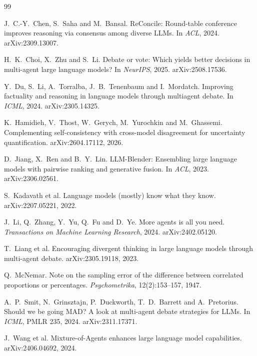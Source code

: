 \documentclass[11pt]{article}
\begin{document}
\begin{thebibliography}{99}
\setlength{\itemsep}{2pt}

 J.\ C.-Y.\ Chen, S.\ Saha and M.\ Bansal. ReConcile: Round-table conference improves reasoning via consensus among diverse LLMs. In \emph{ACL}, 2024. arXiv:2309.13007.

 H.\ K.\ Choi, X.\ Zhu and S.\ Li. Debate or vote: Which yields better decisions in multi-agent large language models? In \emph{NeurIPS}, 2025. arXiv:2508.17536.

 Y.\ Du, S.\ Li, A.\ Torralba, J.\ B.\ Tenenbaum and I.\ Mordatch. Improving factuality and reasoning in language models through multiagent debate. In \emph{ICML}, 2024. arXiv:2305.14325.

 K.\ Hamidieh, V.\ Thost, W.\ Gerych, M.\ Yurochkin and M.\ Ghassemi. Complementing self-consistency with cross-model disagreement for uncertainty quantification. arXiv:2604.17112, 2026.

 D.\ Jiang, X.\ Ren and B.\ Y.\ Lin. LLM-Blender: Ensembling large language models with pairwise ranking and generative fusion. In \emph{ACL}, 2023. arXiv:2306.02561.

 S.\ Kadavath et al. Language models (mostly) know what they know. arXiv:2207.05221, 2022.

 J.\ Li, Q.\ Zhang, Y.\ Yu, Q.\ Fu and D.\ Ye. More agents is all you need. \emph{Transactions on Machine Learning Research}, 2024. arXiv:2402.05120.

 T.\ Liang et al. Encouraging divergent thinking in large language models through multi-agent debate. arXiv:2305.19118, 2023.

 Q.\ McNemar. Note on the sampling error of the difference between correlated proportions or percentages. \emph{Psychometrika}, 12(2):153--157, 1947.

 A.\ P.\ Smit, N.\ Grinsztajn, P.\ Duckworth, T.\ D.\ Barrett and A.\ Pretorius. Should we be going MAD? A look at multi-agent debate strategies for LLMs. In \emph{ICML}, PMLR 235, 2024. arXiv:2311.17371.

 J.\ Wang et al. Mixture-of-Agents enhances large language model capabilities. arXiv:2406.04692, 2024.


\end{thebibliography}
\end{document}
